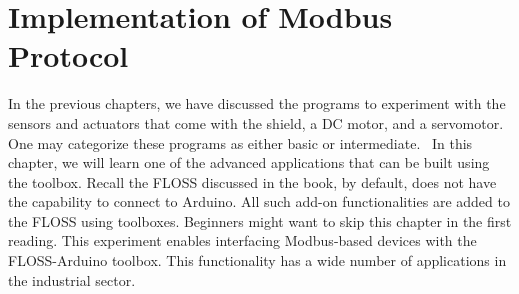 \chapter {Implementation of Modbus Protocol}
\thispagestyle{empty}
\label{modbus}

\newcommand{\LocMODfig}{\Origin/user-code/modbus/figures}
\newcommand{\LocMODscicode}{\Origin/user-code/modbus/scilab}
\newcommand{\LocMODscibrief}[1]{{\tt \seqsplit{%
        Origin/user-code/modbus/scilab}}, see \fnrefp{fn:file-loc}}
\newcommand{\LocMODardcode}{\Origin/user-code/modbus/arduino}
\newcommand{\LocMODardbrief}[1]{{\tt \seqsplit{%
        Origin/user-code/modbus/arduino}}, see \fnrefp{fn:file-loc}}

\newcommand{\LocMODpycode}{\Origin/user-code/modbus/python}
\newcommand{\LocMODpybrief}[1]{{\tt \seqsplit{%
        Origin/user-code/modbus/python}}, see \fnrefp{fn:file-loc}}


\newcommand{\LocMODjuliacode}{\Origin/user-code/modbus/julia}
\newcommand{\LocMODjuliabrief}[1]{{\tt \seqsplit{%
        Origin/user-code/modbus/julia}}, see \fnrefp{fn:file-loc}}




\newcommand{\LocMODOpenModelicacode}{\Origin/user-code/modbus/OpenModelica}
\newcommand{\LocMODOpenModelicabrief}[1]{{\tt \seqsplit{%
        Origin/user-code/modbus/OpenModelica}}, see \fnrefp{fn:file-loc}}


In the previous chapters, we have discussed the programs to experiment with the sensors and actuators that come with the shield, a DC motor, and a servomotor. One may categorize these programs as either basic or intermediate.  In this chapter, we will learn one of the advanced applications that can be built using the toolbox. Recall the FLOSS discussed in the book, by default, does not have the capability to connect to Arduino. All such add-on functionalities are added to the FLOSS using toolboxes. Beginners might want to skip this chapter in the first reading. This experiment enables interfacing Modbus-based devices with the FLOSS-Arduino toolbox. This functionality has a wide number of applications in the industrial sector.


